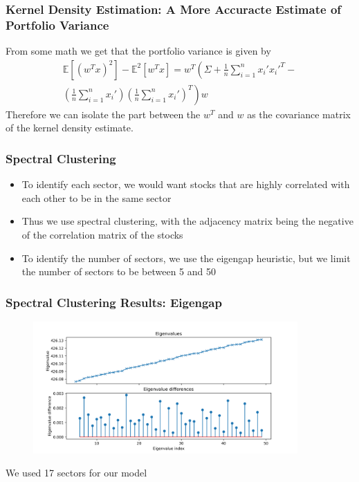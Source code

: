 \documentclass{beamer}
\begin{document}
\begin{frame}
    \frametitle{Kernel Density Estimation: A More Accuracte Estimate of Portfolio Variance}
    From some math we get that the portfolio variance is given by 
    \begin{multline}
        \mathbb{E}[(w^Tx)^2]-\mathbb{E}^2[w^Tx] = w^T\left(\Sigma +  \frac{1}{n}\sum_{i=1}^nx_i'x_i'^T - \right.
        \\ \left.\left(\frac{1}{n} \sum_{i=1}^nx_i'\right)\left(\frac{1}{n} \sum_{i=1}^nx_i'\right)^T\right)w
    \end{multline}
    Therefore we can isolate the part between the $w^T$ and $w$ as the covariance matrix of the kernel density estimate.
\end{frame}
\begin{frame}
    \frametitle{Spectral Clustering}
    \begin{itemize}
        \item To identify each sector, we would want stocks that are highly correlated with each other to be in the same sector
        \item Thus we use spectral clustering, with the adjacency matrix being the negative of the correlation matrix of the stocks
        \item To identify the number of sectors, we use the eigengap heuristic, but we limit the number of sectors to be between 5 and 50
    \end{itemize}
\end{frame}
\begin{frame}
    \frametitle{Spectral Clustering Results: Eigengap}
    \begin{figure}[H]
        \centering
        \includegraphics[width=0.9\textwidth]{../eigenvalues.png}
    \end{figure}
    We used 17 sectors for our model    
\end{frame}
\end{document}
